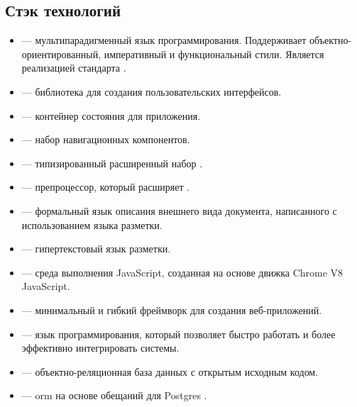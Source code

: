 \subsection{Стэк технологий}
\begin{itemize}
    \item \textcite{wiki:js} --- мультипарадигменный язык программирования. Поддерживает объектно-ориентированный, императивный и функциональный стили. Является реализацией стандарта \textcite{wiki:es}.
    \item \textcite{react} --- \textcite{wiki:js} библиотека для создания пользовательских интерфейсов.
    \item \textcite{redux} --- контейнер состояния для \textcite{wiki:js} приложения.
    \item \textcite{react-router} --- набор навигационных компонентов.
    \item \textcite{ts} --- типизированный расширенный набор \textcite{wiki:js}.
    \item \textcite{scss} --- препроцессор, который расширяет \textcite{wiki:css}.
    \item \textcite{wiki:css} --- формальный язык описания внешнего вида документа, написанного с использованием языка разметки.
    \item \textcite{wiki:html} --- гипертекстовый язык разметки.
    \item \textcite{node.js} --- среда выполнения JavaScript, созданная на основе движка Chrome V8 JavaScript.
    \item \textcite{express} --- минимальный и гибкий \textcite{node.js} фреймворк для создания веб-приложений.
    \item \textcite{python} --- язык программирования, который позволяет быстро работать и более эффективно интегрировать системы.
    \item \textcite{postgres} --- объектно-реляционная база данных с открытым исходным кодом.
    \item \textcite{seqorm} --- \textcite{node.js} \acrshort{orm} на основе обещаний для Postgres \textcite{postgres}.
\end{itemize}

